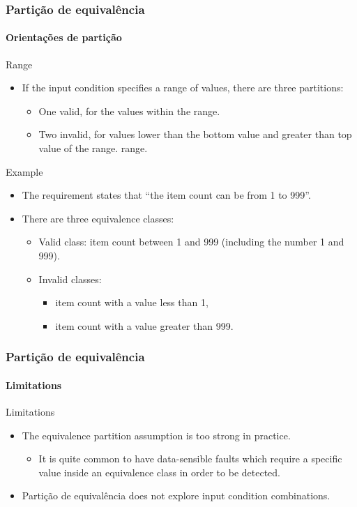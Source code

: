 \begin{frame}
\frametitle{Partição de equivalência}
\framesubtitle{Orientações de partição}

\begin{block:fact}{Range}
\begin{itemize}
	\item If the input condition specifies a range of values, there are three
	partitions:
	\begin{itemize}
		\item One valid, for the values within the range.

		\item Two invalid, for values lower than the bottom value and greater
		than top value of the range.
		range.
	\end{itemize}
\end{itemize}
\end{block:fact}


\begin{block}{Example}
\begin{itemize}
	\item The requirement states that ``the item count can be from 1 to 999''.

	\item There are three equivalence classes:
	\begin{itemize}
		\item Valid class: item count between 1 and 999 (including the number
		1 and 999).
		\item Invalid classes:
		\begin{itemize}
			\item item count with a value less than 1,
			\item item count with a value greater than 999.
		\end{itemize}
	\end{itemize}
\end{itemize}
\end{block}
\end{frame}



\begin{frame}
\frametitle{Partição de equivalência}
\framesubtitle{Limitations}

\begin{block:fact}{Limitations}
\begin{itemize}
	\item The equivalence partition assumption is too strong in practice.
	\begin{itemize}
		\item It is quite common to have data-sensible faults which require a
		specific value inside an equivalence class in order to be detected.
	\end{itemize}

	\item Partição de equivalência does not explore input condition combinations.
\end{itemize}
\end{block:fact}
\end{frame}